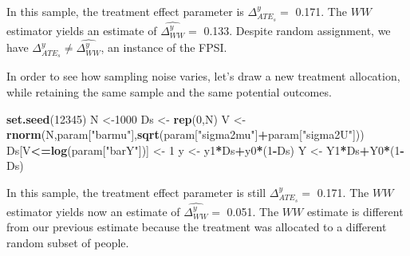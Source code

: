 \documentclass[]{book}
\newenvironment{Shaded}{\begin{snugshade}}{\end{snugshade}}
\newcommand{\KeywordTok}[1]{\textcolor[rgb]{0.13,0.29,0.53}{\textbf{#1}}}
\newcommand{\DecValTok}[1]{\textcolor[rgb]{0.00,0.00,0.81}{#1}}
\newcommand{\StringTok}[1]{\textcolor[rgb]{0.31,0.60,0.02}{#1}}
\newcommand{\OperatorTok}[1]{\textcolor[rgb]{0.81,0.36,0.00}{\textbf{#1}}}
\newcommand{\NormalTok}[1]{#1}
\theoremstyle{definition}
\theoremstyle{definition}
\theoremstyle{definition}
\theoremstyle{remark}
\begin{document}
In this sample, the treatment effect parameter is \(\Delta^y_{ATE_s}=\)
0.171. The \(WW\) estimator yields an estimate of
\(\hat{\Delta^y_{WW}}=\) 0.133. Despite random assignment, we have
\(\Delta^y_{ATE_s}\neq\hat{\Delta^y_{WW}}\), an instance of the FPSI.

In order to see how sampling noise varies, let's draw a new treatment
allocation, while retaining the same sample and the same potential
outcomes.

\begin{Shaded}
\begin{Highlighting}[]
\KeywordTok{set.seed}\NormalTok{(}\DecValTok{12345}\NormalTok{)}
\NormalTok{N <-}\DecValTok{1000}
\NormalTok{Ds <-}\StringTok{ }\KeywordTok{rep}\NormalTok{(}\DecValTok{0}\NormalTok{,N)}
\NormalTok{V <-}\StringTok{ }\KeywordTok{rnorm}\NormalTok{(N,param[}\StringTok{"barmu"}\NormalTok{],}\KeywordTok{sqrt}\NormalTok{(param[}\StringTok{"sigma2mu"}\NormalTok{]}\OperatorTok{+}\NormalTok{param[}\StringTok{"sigma2U"}\NormalTok{]))}
\NormalTok{Ds[V}\OperatorTok{<=}\KeywordTok{log}\NormalTok{(param[}\StringTok{"barY"}\NormalTok{])] <-}\StringTok{ }\DecValTok{1} 
\NormalTok{y <-}\StringTok{ }\NormalTok{y1}\OperatorTok{*}\NormalTok{Ds}\OperatorTok{+}\NormalTok{y0}\OperatorTok{*}\NormalTok{(}\DecValTok{1}\OperatorTok{-}\NormalTok{Ds)}
\NormalTok{Y <-}\StringTok{ }\NormalTok{Y1}\OperatorTok{*}\NormalTok{Ds}\OperatorTok{+}\NormalTok{Y0}\OperatorTok{*}\NormalTok{(}\DecValTok{1}\OperatorTok{-}\NormalTok{Ds)}
\end{Highlighting}
\end{Shaded}

In this sample, the treatment effect parameter is still
\(\Delta^y_{ATE_s}=\) 0.171. The \(WW\) estimator yields now an estimate
of \(\hat{\Delta^y_{WW}}=\) 0.051. The \(WW\) estimate is different from
our previous estimate because the treatment was allocated to a different
random subset of people.
\end{document}
